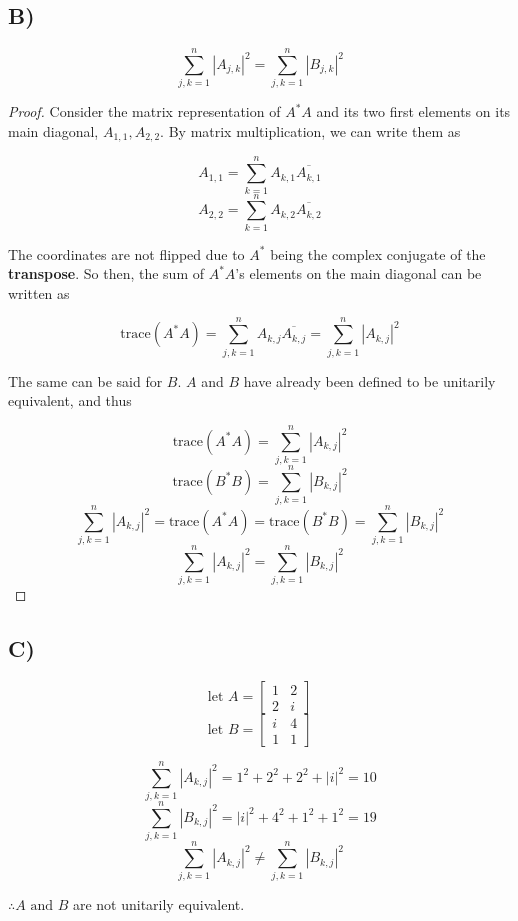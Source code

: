 \documentclass[12pt, letterpaper]{article}
\begin{document}
\subsection*{B)}

\[ \sum^n_{j,k=1} |A_{j,k}|^2 = \sum^n_{j,k=1} |B_{j,k}|^2 \]

\begin{proof}
Consider the matrix representation of $A^*A$ and its two first elements on its main diagonal, $A_{1,1}, A_{2,2}$. By matrix multiplication, we can write them as

\[ A_{1,1} = \sum^n_{k=1} A_{k,1} \overline{A_{k,1}} \]
\[ A_{2,2} = \sum^n_{k=1} A_{k,2} \overline{A_{k,2}} \]

The coordinates are not flipped due to $A^*$ being the complex conjugate of the \textbf{transpose}. So then, the sum of $A^*A$'s elements on the main diagonal can be written as

\[ \text{trace}(A^*A) = \sum^n_{j,k=1} A_{k,j} \overline{A_{k,j}} = \sum^n_{j,k=1} |A_{k,j}|^2 \]

The same can be said for $B$. $A$ and $B$ have already been defined to be unitarily equivalent, and thus

\[ \text{trace}(A^*A) = \sum^n_{j,k=1} |A_{k,j}|^2 \]
\[ \text{trace}(B^*B) = \sum^n_{j,k=1} |B_{k,j}|^2 \]
\[ \sum^n_{j,k=1} |A_{k,j}|^2 = \text{trace}(A^*A) = \text{trace}(B^*B) = \sum^n_{j,k=1} |B_{k,j}|^2 \]
\[ \sum^n_{j,k=1} |A_{k,j}|^2 = \sum^n_{j,k=1} |B_{k,j}|^2 \]

\end{proof}

\subsection*{C)}

\[ \text{let } A = \begin{bmatrix} 1 & 2 \\ 2 & i \end{bmatrix} \]
\[ \text{let } B = \begin{bmatrix} i & 4 \\ 1 & 1 \end{bmatrix} \]

\[ \sum^n_{j,k=1} |A_{k,j}|^2 = 1^2 + 2^2 + 2^2 + |i|^2 = 10 \]
\[ \sum^n_{j,k=1} |B_{k,j}|^2 = |i|^2 + 4^2 + 1^2 + 1^2 = 19 \]
\[ \sum^n_{j,k=1} |A_{k,j}|^2 \neq \sum^n_{j,k=1} |B_{k,j}|^2 \]

$\therefore A \text{ and } B$ are not unitarily equivalent. 
\end{document}
